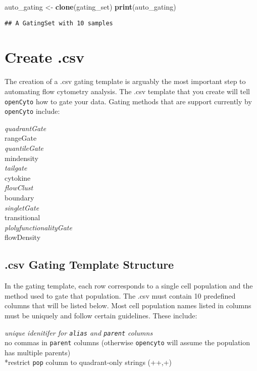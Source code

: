 \documentclass[]{book}
\newenvironment{Shaded}{\begin{snugshade}}{\end{snugshade}}
\newcommand{\KeywordTok}[1]{\textcolor[rgb]{0.13,0.29,0.53}{\textbf{#1}}}
\newcommand{\NormalTok}[1]{#1}
\newcommand{\StringTok}[1]{\textcolor[rgb]{0.31,0.60,0.02}{#1}}
\begin{document}
\begin{Shaded}
\begin{Highlighting}[]
\NormalTok{auto_gating <-}\StringTok{ }\KeywordTok{clone}\NormalTok{(gating_set)}
\KeywordTok{print}\NormalTok{(auto_gating)}
\end{Highlighting}
\end{Shaded}

\begin{verbatim}
## A GatingSet with 10 samples
\end{verbatim}

\hypertarget{create-.csv}{%
\chapter{Create .csv}\label{create-.csv}}

The creation of a .csv gating template is arguably the most important step to automating flow cytometry analysis. The .csv template that you create will tell \texttt{openCyto} how to gate your data. Gating methods that are support currently by \texttt{openCyto} include:

\emph{quadrantGate\\
}rangeGate\\
\emph{quantileGate\\
}mindensity\\
\emph{tailgate\\
}cytokine\\
\emph{flowClust\\
}boundary\\
\emph{singletGate\\
}transitional\\
\emph{plolyfunctionalityGate\\
}flowDensity

\hypertarget{csv-gating-template-structure}{%
\section{.csv Gating Template Structure}\label{csv-gating-template-structure}}

In the gating template, each row corresponds to a single cell population and the method used to gate that population. The .csv must contain 10 predefined columns that will be listed below. Most cell population names listed in columns must be uniquely and follow certain guidelines. These include:

\emph{unique idenitifer for \texttt{alias} and \texttt{parent} columns\\
}no commas in \texttt{parent} columns (otherwise \texttt{opencyto} will assume the population has multiple parents)\\
*restrict \texttt{pop} column to quadrant-only strings (++,+)
\end{document}
